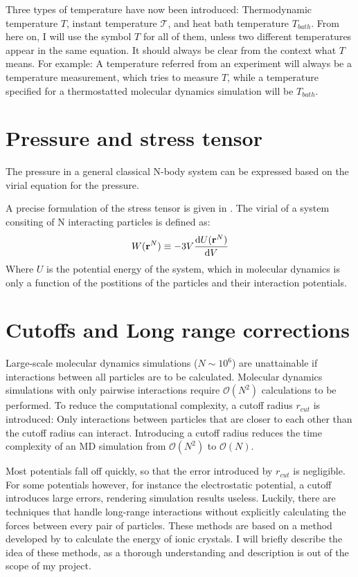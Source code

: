 Three types of temperature have now been introduced: Thermodynamic temperature $T$, instant temperature $\mathcal{T}$, and heat bath temperature $T_{bath}$. From here on, I will use the symbol $T$ for all of them, unless two different temperatures appear in the same equation. It should always be clear from the context what $T$ means. For example: A temperature referred from an experiment will always be a temperature measurement, which tries to measure $T$, while a temperature specified for a thermostatted molecular dynamics simulation will be $T_{bath}$.

\section{Pressure and stress tensor}
The pressure in a general classical N-body system can be expressed based on the virial equation for the pressure.

A precise formulation of the stress tensor is given in \cite{Thompson2009}.
The virial of a system consiting of N interacting particles is defined as:
\begin{equation}
	W(\mathbf{r}^N) \equiv -3V\frac{\mathrm{d} U(\mathbf{r}^N)}{\mathrm{d} V}
\end{equation}
Where $U$ is the potential energy of the system, which in molecular dynamics is only a function of the postitions of the particles and their interaction potentials.


\section{Cutoffs and Long range corrections}
Large-scale molecular dynamics simulations ($N \sim 10^6$) are unattainable if interactions between all particles are to be calculated. Molecular dynamics simulations with only pairwise interactions require $\mathcal{O}(N^2)$ calculations to be performed. To reduce the computational complexity, a cutoff radius $r_{cut}$ is introduced: Only interactions between particles that are closer to each other than the cutoff radius can interact. Introducing a cutoff radius reduces the time complexity of an MD simulation from $\mathcal{O}(N^2)$ to $\mathcal{O}(N)$. 

Most potentials fall off quickly, so that the error introduced by $r_{cut}$ is negligible. For some potentials however, for instance the electrostatic potential, a cutoff introduces large errors, rendering simulation results useless. Luckily, there are techniques that handle long-range interactions without explicitly calculating the forces between every pair of particles. These methods are based on a method developed by \citet{ANDP:ANDP19213690304} to calculate the energy of ionic crystals. I will briefly describe the idea of these methods, as a thorough understanding and description is out of the scope of my project.

